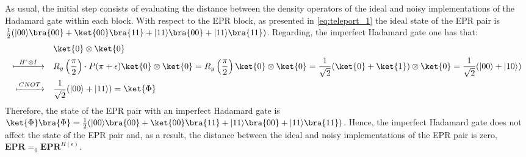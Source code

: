 As usual, the initial step consists of evaluating the distance between the density operators of the ideal and noisy implementations of the Hadamard gate within each block. With respect to the EPR block, as presented in  \autoref{eq:teleport_1} the ideal state of the EPR pair is $\frac{1}{2} (|00\rangle \bra{00} + \ket{00}\bra{11} + |11\rangle \bra{00} + |11\rangle \bra{11})$. Regarding, the imperfect Hadamard gate one has that:
\begin{equation}
  \begin{split}
    &  \ket{0} \otimes \ket{0}   \\
\xmapsto{ \hspace{5pt}  H^{\epsilon} \otimes I  \hspace{5pt}} \quad & R_{y}\left(\frac{\pi}{2}\right)\cdot P(\pi + \epsilon) \ket{0} \otimes \ket{0} =R_{y}\left(\frac{\pi}{2}\right)\ket{0} \otimes \ket{0} =  \frac{1}{\sqrt{2}} (\ket{0} + \ket{1})  \otimes \ket{0} = \frac{1}{\sqrt{2}} (|00\rangle + |10\rangle )   \\
\xmapsto{\hspace{1pt} CNOT \hspace{1pt}} \quad & \frac{1}{\sqrt{2}} (|00\rangle + |11\rangle) = \ket{\Phi} \\
  \end{split}
\end{equation}
Therefore, the state of the EPR pair with an imperfect Hadamard gate is $\ket{\Phi} \bra{\Phi} = \frac{1}{2} (|00\rangle \bra{00} + \ket{00}\bra{11} + |11\rangle \bra{00} + |11\rangle \bra{11})$. Hence, the imperfect Hadamard gate does not affect the state of the EPR pair and, as a result, the distance between the ideal and noisy implementations of the EPR pair is zero, $\textbf{EPR}=_{0}\textbf{EPR}^{H(\epsilon)}$.

